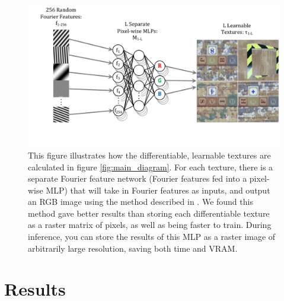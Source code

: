 \documentclass{article}
\begin{document}
\begin{figure}[H]
	\begin{center}
		\includegraphics[width=400pt]{../images/learnable_textures.pdf}
	\end{center}
	\caption{
		This figure illustrates how the differentiable, learnable textures are calculated in figure \ref{fig:main_diagram}.
		For each texture, there is a separate Fourier feature network (Fourier features fed into a pixel-wise MLP) that will take in Fourier features as inputs, and output an RGB image using the method described in \citet{fourier_feature_networks}.
		We found this method gave better results than storing each differentiable texture as a raster matrix of pixels, as well as being faster to train.
		During inference, you can store the results of this MLP as a raster image of arbitrarily large resolution, saving both time and VRAM.
	}
	\label{fig:learnable_textures}
\end{figure}





\section{Results}
\label{sec:results}
\end{document}
